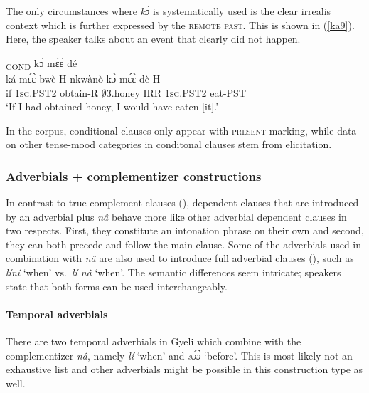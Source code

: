 The only circumstances where {\itshape kɔ̀} is systematically used is the clear irrealis context which is further expressed by the \textsc{remote past}. This is shown in (\ref{ka9}). Here, the speaker talks about an event that clearly did not happen.

\begin{exe}
\ex\label{ka9}
  \textsubscript{COND} kɔ̀ mɛ́ɛ̀ dé \\
       ká mɛ́ɛ̀ bwè-H nkwànò kɔ̀ mɛ́ɛ̀ dè-H \\
       if 1\textsc{sg}.PST2 obtain-R $\emptyset$3.honey IRR 1\textsc{sg}.PST2 eat-PST \\ 
 \trans `If I had obtained honey, I would have eaten [it].'
\end{exe}

In the corpus, conditional clauses only appear with \textsc{present} marking, while data on other tense-mood categories in conditonal clauses stem from elicitation. 










\subsubsection{Adverbials + complementizer constructions}
\label{sec:AComp}

In contrast to true complement clauses (), dependent clauses that are introduced by an adverbial plus {\itshape nâ} behave more like other adverbial dependent clauses in two respects. First, they constitute an intonation phrase on their own and second, they can both precede and follow the main clause. Some of the adverbials used in combination with {\itshape nâ} are also used to introduce full adverbial clauses (), such as {\itshape líní} `when' vs.\ {\itshape lí nâ} `when'. The semantic differences seem intricate; speakers state that both forms can be used interchangeably.


\paragraph{Temporal adverbials}

There are two temporal adverbials in Gyeli which combine with the complementizer {\itshape nâ}, namely {\itshape lí} `when' and {\itshape sɔ́ɔ̀} `before'. This is most likely not an exhaustive list and other adverbials might be possible in this construction type as well.

